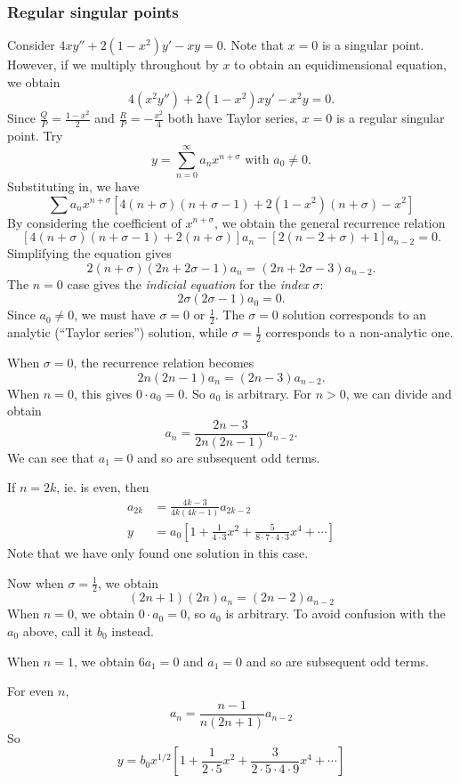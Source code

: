 \documentclass[a4paper]{article}
\begin{document}
\subsubsection*{Regular singular points}
\begin{eg}
  Consider $4xy'' + 2(1 - x^2)y' - xy = 0$. Note that $x = 0$ is a singular point. However, if we multiply throughout by $x$ to obtain an equidimensional equation, we obtain
  \[
    4(x^2 y'') + 2(1 - x^2)xy' - x^2 y = 0.
  \]
  Since $\frac{Q}{P} = \frac{1 - x^2}{2}$ and $\frac{R}{P} = -\frac{x^2}{4}$ both have Taylor series, $x = 0$ is a regular singular point. Try
  \[
    y = \sum_{n = 0}^\infty a_n x^{n + \sigma}\text{ with }a_0 \not= 0.
  \]
  Substituting in, we have
  \[
    \sum a_n x^{n + \sigma}[4(n + \sigma)(n + \sigma - 1) + 2(1 - x^2)(n + \sigma) - x^2]
  \]
  By considering the coefficient of $x^{n + \sigma}$, we obtain the general recurrence relation
  \[
    [4(n + \sigma)(n + \sigma - 1) + 2(n + \sigma)]a_n -[2(n - 2 + \sigma) + 1]a_{n - 2} = 0.
  \]
  Simplifying the equation gives
  \[
    2(n + \sigma)(2n + 2\sigma - 1)a_n = (2n + 2\sigma-3)a_{n - 2}.
  \]
  The $n = 0$ case gives the \emph{indicial equation} for the \emph{index} $\sigma$:
  \[
    2\sigma(2\sigma - 1)a_0 = 0.
  \]
  Since $a_0 \not= 0$, we must have $\sigma = 0$ or $\frac{1}{2}$. The $\sigma = 0$ solution corresponds to an analytic (``Taylor series'') solution, while $\sigma = \frac{1}{2}$ corresponds to a non-analytic one.

  When $\sigma = 0$, the recurrence relation becomes
  \[
    2n(2n - 1)a_n = (2n - 3)a_{n - 2}.
  \]
  When $n = 0$, this gives $0\cdot a_0 = 0$. So $a_0$ is arbitrary. For $n >0$, we can divide and obtain
  \[
    a_n = \frac{2n - 3}{2n(2n - 1)}a_{n - 2}.
  \]
  We can see that $a_1 = 0$ and so are subsequent odd terms.

  If $n = 2k$, ie. is even, then
  \begin{align*}
    a_{2k} &= \frac{4k - 3}{4k(4k - 1)}a_{2k - 2}\\
    y &= a_0\left[1 + \frac{1}{4\cdot 3}x^2 + \frac{5}{8\cdot 7\cdot 4\cdot 3}x^4 + \cdots\right]
  \end{align*}
  Note that we have only found one solution in this case.

  Now when $\sigma = \frac{1}{2}$, we obtain
  \[
    (2n + 1)(2n)a_n = (2n - 2)a_{n - 2}
  \]
  When $n = 0$, we obtain $0\cdot a_0 = 0$, so $a_0$ is arbitrary. To avoid confusion with the $a_0$ above, call it $b_0$ instead.

  When $n = 1$, we obtain $6a_1 = 0$ and $a_1 = 0$ and so are subsequent odd terms.

  For even $n$,
  \[
    a_n = \frac{n - 1}{n(2n + 1)}a_{n - 2}
  \]
  So
  \[
    y = b_0 x^{1/2}\left[1 + \frac{1}{2\cdot 5}x^2 + \frac{3}{2\cdot 5\cdot 4\cdot 9}x^4 + \cdots\right]
  \]
\end{eg}
\end{document}
